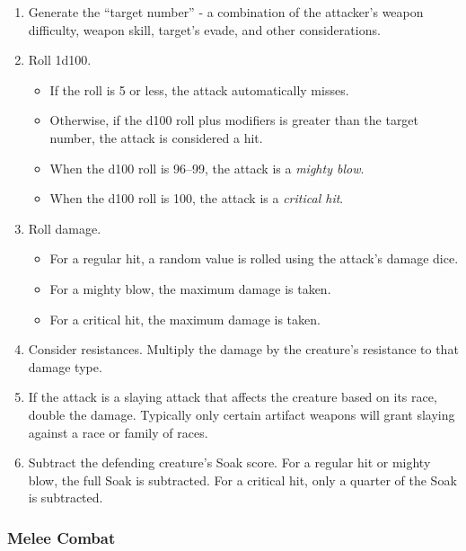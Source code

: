 \begin{enumerate}
\item Generate the ``target number'' - a combination of the attacker's
weapon difficulty, weapon skill, target's evade, and other considerations.

\item Roll 1d100.
  \begin{itemize}
  \item If the roll is 5 or less, the attack automatically misses.

  \item Otherwise, if the d100 roll plus modifiers is greater than the 
  target number, the attack is considered a hit.  

  \item When the d100 roll is 96--99, the attack is a {\it mighty blow}.

  \item When the d100 roll is 100, the attack is a {\it critical hit}.
  \end{itemize}
\item Roll damage.
  \begin{itemize}
  \item For a regular hit, a random value is rolled using the attack's
  damage dice.

  \item For a mighty blow, the maximum damage is taken.

  \item For a critical hit, the maximum damage is taken.
  \end{itemize}

\item Consider resistances.  Multiply the damage by the creature's
resistance to that damage type.

\item If the attack is a slaying attack that affects the creature based on
its race, double the damage.  Typically only certain artifact weapons will
grant slaying against a race or family of races.

\item Subtract the defending creature's Soak score.  For a regular hit
or mighty blow, the full Soak is subtracted.  For a critical hit, only a
quarter of the Soak is subtracted.
\end{enumerate}

\subsubsection{Melee Combat}

